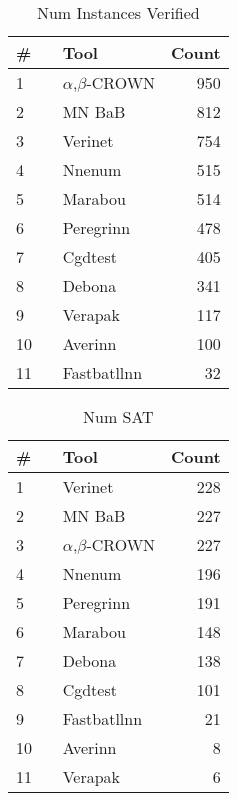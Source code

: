 
\begin{table}[h]
\begin{center}
\caption{Num Instances Verified} \label{tab:stats1}
{\setlength{\tabcolsep}{2pt}
\begin{tabular}[h]{@{}llr@{}}
\toprule
\textbf{\# ~} & \textbf{Tool} & \textbf{Count}\\
\midrule
1 & $\alpha$,$\beta$-CROWN & 950 \\
2 & MN BaB & 812 \\
3 & Verinet & 754 \\
4 & Nnenum & 515 \\
5 & Marabou & 514 \\
6 & Peregrinn & 478 \\
7 & Cgdtest & 405 \\
8 & Debona & 341 \\
9 & Verapak & 117 \\
10 & Averinn & 100 \\
11 & Fastbatllnn & 32 \\
\bottomrule
\end{tabular}
}
\end{center}
\end{table}




\begin{table}[h]
\begin{center}
\caption{Num SAT} \label{tab:stats2}
{\setlength{\tabcolsep}{2pt}
\begin{tabular}[h]{@{}llr@{}}
\toprule
\textbf{\# ~} & \textbf{Tool} & \textbf{Count}\\
\midrule
1 & Verinet & 228 \\
2 & MN BaB & 227 \\
3 & $\alpha$,$\beta$-CROWN & 227 \\
4 & Nnenum & 196 \\
5 & Peregrinn & 191 \\
6 & Marabou & 148 \\
7 & Debona & 138 \\
8 & Cgdtest & 101 \\
9 & Fastbatllnn & 21 \\
10 & Averinn & 8 \\
11 & Verapak & 6 \\
\bottomrule
\end{tabular}
}
\end{center}
\end{table}



